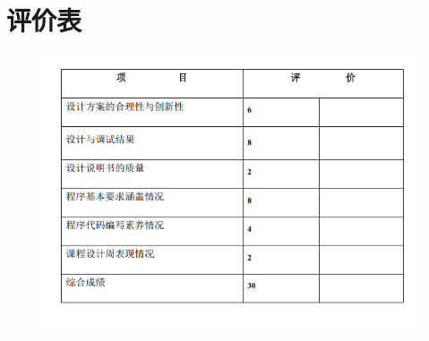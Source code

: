 \documentclass[fontset=windows]{article}
\begin{document}
\section*{评价表}
\vspace*{-0.5cm}
\begin{figure}[h!]
	\begin{center}
		\includegraphics[width = 15cm]{评价表.png}
	\end{center}
\end{figure}
\end{document}

